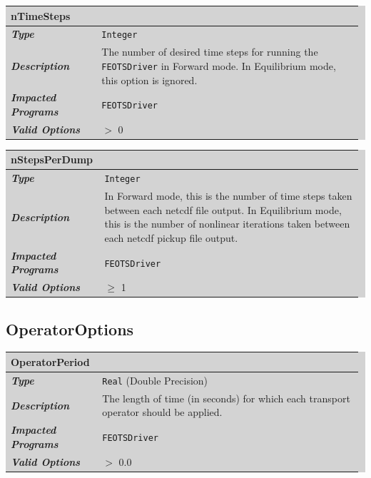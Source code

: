 \documentclass{softwaremanual}
\begin{document}

\noindent\begingroup\setlength{\fboxsep}{0pt}
\colorbox{lightgray}{
\begin{tabular}{p{0.25\linewidth} p{0.725\linewidth}}
\toprule
\textbf{nTimeSteps} & \\
\midrule
\textbf{\textit{Type}} & \texttt{Integer} \\
\midrule
\textbf{\textit{Description}} & The number of desired time steps for running the \texttt{FEOTSDriver} in Forward mode. In Equilibrium mode, this option is ignored.  \\
\midrule
\textbf{\textit{Impacted Programs}} & \texttt{FEOTSDriver} \\
\midrule
\textbf{\textit{Valid Options}}  & $>$ 0 \\
\bottomrule
\end{tabular}
}\endgroup


\noindent\begingroup\setlength{\fboxsep}{0pt}
\colorbox{lightgray}{
\begin{tabular}{p{0.25\linewidth} p{0.725\linewidth}}
\toprule
\textbf{nStepsPerDump} & \\
\midrule
\textbf{\textit{Type}} & \texttt{Integer} \\
\midrule
\textbf{\textit{Description}} & In Forward mode, this is the number of time steps taken between each netcdf file output. In Equilibrium mode, this is the number of nonlinear iterations taken between each netcdf pickup file output. \\
\midrule
\textbf{\textit{Impacted Programs}} & \texttt{FEOTSDriver} \\
\midrule
\textbf{\textit{Valid Options}}  & $\geq$ 1 \\
\bottomrule
\end{tabular}
}\endgroup

\subsection{OperatorOptions}
\noindent\begingroup\setlength{\fboxsep}{0pt}
\colorbox{lightgray}{
\begin{tabular}{p{0.25\linewidth} p{0.725\linewidth}}
\toprule
\textbf{OperatorPeriod} & \\
\midrule
\textbf{\textit{Type}} & \texttt{Real} (Double Precision) \\
\midrule
\textbf{\textit{Description}} & The length of time (in seconds) for which each transport operator should be applied. \\
\midrule
\textbf{\textit{Impacted Programs}} & \texttt{FEOTSDriver} \\
\midrule
\textbf{\textit{Valid Options}}  & $>$ 0.0 \\
\bottomrule
\end{tabular}
}\endgroup
\end{document}
